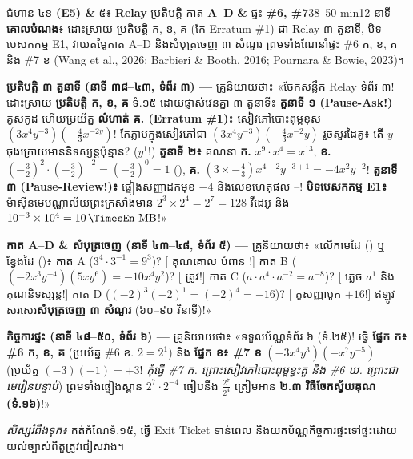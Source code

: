 \documentclass[a4paper,12pt]{article}
\newcommand{\en}[1]{{\TimesEn #1}}
\newcommand{\enbf}[1]{{\TimesEn\textbf{#1}}}
\newcommand{\unit}[1]{\,\text{\en{#1}}}
\newcommand{\cnum}[1]{{\TimesEn\fontsize{10.5pt}{12pt}\selectfont\ding{\numexpr181+#1\relax}}}
\newcommand{\scriptlead}{{\normalfont\mdseries\muol\fontsize{10.8pt}{17pt}\selectfont គ្រូនិយាយថា៖}}
\begin{document}
\Needspace{2.0cm}
\begin{phasebox}{ជំហាន ៤ខ \enbf{(E5) \&} ៥៖ \enbf{Relay} ប្រតិបត្តិ កាត \enbf{A--D} \enbf{\&} ផ្ទះ \enbf{\#6, \#7}}{38--50 min}{12 នាទី}
\textbf{គោលបំណង}៖ ដោះស្រាយ ប្រតិបត្តិ ក, ខ, គ (កែ \en{Erratum \#1}) ជា \en{Relay} ៣ តួនាទី, បិទបេសកកម្ម \en{E1}, វាយតម្លៃកាត \en{A--D} និងសំបុត្រចេញ ៣ សំណួរ ព្រមទាំងណែនាំផ្ទះ \en{\#6} ក, ខ, គ និង \en{\#7} ខ \en{(Wang et al., 2026; Barbieri \& Booth, 2016; Pournara \& Bowie, 2023)}។
\end{phasebox}
\begin{scriptbox}
  \textbf{ប្រតិបត្តិ ៣ តួនាទី (នាទី ៣៨--៤៣, ទំព័រ ៣) —} \scriptlead{} «ចែកសន្លឹក \en{Relay} ទំព័រ ៣! ដោះស្រាយ \textbf{ប្រតិបត្តិ ក, ខ, គ} ទំ.១៥ ដោយផ្លាស់វេនគ្នា ៣ តួនាទី៖ \textbf{តួនាទី ១ (\en{Pause-Ask!})} គូសកូដ \en{[tracing]} ហើយប្រយ័ត្ន \textbf{លំហាត់ គ. (\en{Erratum \#1})}៖ សៀវភៅបោះពុម្ពខុស $(3x^4y^{-3})\allowbreak(-\frac{4}{3}x^{-2y})$! កែភ្លាមក្នុងសៀវភៅជា \textbf{$(3x^4y^{-3})\allowbreak(-\frac{4}{3}x^{-2}y)$} រួចសួរដៃគូ៖ តើ $y$ ចុងក្រោយមាននិទស្សន្តប៉ុន្មាន? ($y^1$!) \textbf{តួនាទី ២៖} គណនា \textbf{ក.} $x^9\cdot x^4=x^{13}$, \textbf{ខ.} $(-\frac{3}{2})^2\cdot(-\frac{3}{2})^{-2}=(-\frac{3}{2})^0=1$ (\cnum{5}), \textbf{គ.} $(3\times -\frac{4}{3})x^{4-2}y^{-3+1}=-4x^2y^{-2}$! \textbf{តួនាទី ៣ (\en{Pause-Review!})៖} ផ្ទៀងសញ្ញាដកមុខ $-4$ និងលេខហេតុផល \cnum{1}--\cnum{5}! \textbf{បិទបេសកកម្ម \en{E1}៖} ម៉ាស៊ីនមេបណ្ណាល័យព្រះក្រសាំងមាន $2^3\times 2^4=2^7=128$ វីដេអូ និង $10^{-3}\times 10^4=10\unit{MB}$!»\par\vspace{3pt}
  \textbf{កាត \en{A--D} \& សំបុត្រចេញ (នាទី ៤៣--៤៨, ទំព័រ ៥) —} \scriptlead{} «លើកមេដៃ () ឬខ្វែងដៃ ()៖ កាត \en{A} ($3^4\cdot 3^{-1}=9^3$)? [ គុណគោល បំពាន \cnum{1}!] កាត \en{B} ($(-2x^3y^{-4})(5xy^6)=-10x^4y^2$)? [ ត្រូវ!] កាត \en{C} ($a\cdot a^4\cdot a^{-2}=a^{-8}$)? [ ភ្លេច $a^1$ និងគុណនិទស្សន្ត!] កាត \en{D} ($(-2)^3(-2)^1=(-2)^4=-16$)? [ គូសញ្ញាបូក $+16$!] ឥឡូវសរសេរ\textbf{សំបុត្រចេញ ៣ សំណួរ} (៦០--៩០ វិនាទី)!»\par\vspace{3pt}
  \textbf{កិច្ចការផ្ទះ (នាទី ៤៨--៥០, ទំព័រ ៦) —} \scriptlead{} «ទទួលប័ណ្ណទំព័រ ៦ (ទំ.២៥)! ធ្វើ \textbf{ផ្នែក ក៖ \en{\#6} ក, ខ, គ} (ប្រយ័ត្ន \en{\#6} ខ. $2=2^1$) និង \textbf{ផ្នែក ខ៖ \en{\#7} ខ} $(-3x^4y^3)(-x^7y^{-5})$ (ប្រយ័ត្ន $(-3)(-1)=+3$! \textit{កុំធ្វើ \en{\#7} ក. ព្រោះសៀវភៅបោះពុម្ពខ្វះតួ និង \en{\#6} ឃ. ព្រោះជាមេរៀនបន្ទាប់}) ព្រមទាំងផ្ទៀងស្ពាន $2^7\cdot 2^{-4}$ ធៀបនឹង $\frac{2^7}{2^4}$ ត្រៀមអាន \textbf{២.៣ វិធីចែកស្វ័យគុណ (ទំ.១៦)}!»\par
  \textit{សិស្សរំពឹងទុក៖} កត់កំណែទំ.១៥, ធ្វើ \en{Exit Ticket} ទាន់ពេល និងយកប័ណ្ណកិច្ចការផ្ទះទៅផ្ទះដោយយល់ច្បាស់ពីតួត្រូវជៀសវាង។
\end{scriptbox}
\end{document}
